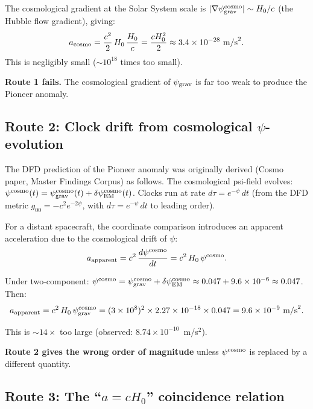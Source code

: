 \documentclass[11pt]{article}
\newcommand{\ee}[1]{\times 10^{#1}}
\newcommand{\psigrav}{\psi_{\rm grav}}
\newcommand{\dpsiEM}{\delta\psi_{\rm EM}}
\newcommand{\Hzero}{H_0}
\begin{document}
The cosmological gradient at the Solar System scale is
$|\nabla\psigrav^{\rm cosmo}| \sim \Hzero/c$ (the Hubble flow gradient),
giving:
\begin{equation}
a_{\rm cosmo} = \frac{c^2}{2}\,\Hzero\,\frac{\Hzero}{c}
= \frac{c\Hzero^2}{2} \approx 3.4\ee{-28}~\text{m/s}^2.
\end{equation}
This is negligibly small ($\sim 10^{18}$ times too small).

\textbf{Route 1 fails.} The cosmological gradient of $\psigrav$ is
far too weak to produce the Pioneer anomaly.

\subsection{Route 2: Clock drift from cosmological $\psi$-evolution}

The DFD prediction of the Pioneer anomaly was originally derived
(Cosmo paper, Master Findings Corpus) as follows. The cosmological
psi-field evolves: $\psi^{\rm cosmo}(t) = \psigrav^{\rm cosmo}(t)
+ \dpsiEM^{\rm cosmo}(t)$. Clocks run at rate $d\tau = e^{-\psi}\,dt$
(from the DFD metric $g_{00} = -c^2 e^{-2\psi}$, with
$d\tau = e^{-\psi}\,dt$ to leading order).

For a distant spacecraft, the coordinate comparison introduces an
apparent acceleration due to the cosmological drift of $\psi$:
\begin{equation}
a_{\rm apparent} = c^2\,\frac{d\psi^{\rm cosmo}}{dt}
= c^2\,\Hzero\,\psi^{\rm cosmo}.
\end{equation}

Under two-component: $\psi^{\rm cosmo} = \psigrav^{\rm cosmo}
+ \dpsiEM^{\rm cosmo} \approx 0.047 + 9.6\ee{-6} \approx 0.047$.
Then:
\begin{equation}
a_{\rm apparent} = c^2\,\Hzero\,\psigrav^{\rm cosmo}
= (3\ee{8})^2 \times 2.27\ee{-18} \times 0.047
= 9.6\ee{-9}~\text{m/s}^2.
\end{equation}

This is $\sim 14\times$ too large (observed: $8.74\ee{-10}$~m/s$^2$).

\textbf{Route 2 gives the wrong order of magnitude} unless
$\psi^{\rm cosmo}$ is replaced by a different quantity.

\subsection{Route 3: The ``$a = c\Hzero$'' coincidence relation}
\end{document}
